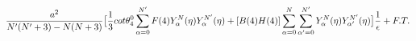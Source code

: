 \begin{equation}
\frac{a^2}{N'(N'+3)-N(N+3)}\big{[}\frac{1}{3}cot{\theta_4^0}\sum_{\alpha =0}^{N'}F(4)Y_{\alpha}^{N}(\eta)Y_{\alpha}^{N'}(\eta)+[B(4)H(4)]\sum_{\alpha =0}^{N}\sum_{\alpha' =0}^{N'}Y_{\alpha}^{N}(\eta)Y_{\alpha'}^{N'}(\eta)\big{]}\frac{1}{\epsilon} + F. T.
\end{equation}

